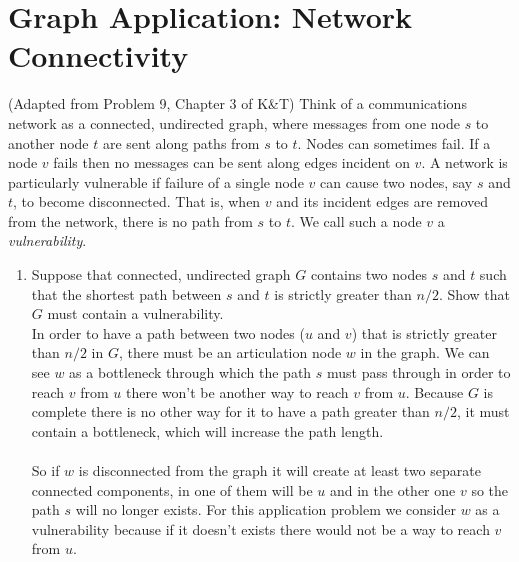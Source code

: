\documentclass[11pt]{article}
\def\ans#1{{\color{ans}#1}}
\begin{document}
\section{Graph Application: Network Connectivity}
\label{sec-4}
(Adapted from Problem 9, Chapter 3 of K\&T) Think of a communications
network  as a connected, undirected graph, where messages from one node $s$ to another node
$t$ are sent along paths from $s$ to $t$.  Nodes can sometimes fail.
If a node $v$ fails then no messages can be sent along edges incident
on $v$. A network is particularly vulnerable if failure of a
single node $v$ can cause two nodes, say $s$ and $t$, to become
disconnected. That is, when $v$ and its incident edges are removed
from the network, there is no path from $s$ to $t$.
We call such a node $v$ a \emph{vulnerability}.

\begin{enumerate}
\item Suppose that connected, undirected graph $G$ contains two nodes $s$ and $t$ such
that the shortest path between $s$ and $t$ is strictly greater than
$n/2$. Show that $G$ must contain a vulnerability. \\
\ans{
  In order to have a path between two nodes ($u$ and $v$) that is strictly greater than $n/2$ in $G$, 
  there must be an articulation node $w$ in the graph. We can see $w$ as a bottleneck through which the 
  path $s$ must pass through in order to reach $v$ from $u$ there won't be another way to reach $v$ 
  from $u$. Because $G$ is complete there is no other way for it to have a path greater than $n/2$, 
  it must contain a bottleneck, which will increase the path length. \\ \\
  So if $w$ is disconnected from the graph it will create at least two separate connected 
  components, in one of them will be $u$ and in the other one $v$ so the path $s$ will 
  no longer exists. For this application problem we consider $w$ as a vulnerability 
  because if it doesn't exists there would not be a way to reach $v$ from $u$.
}


\end{enumerate}
\end{document}
